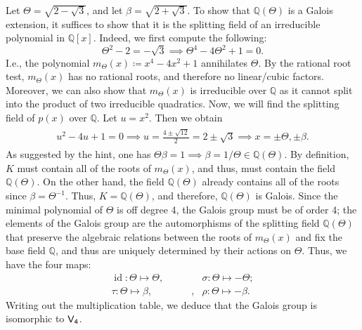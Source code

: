 \documentclass{article}
\begin{document}
	Let $\Theta = \sqrt{2 - \sqrt{3}}$, and let $\beta = \sqrt{2 + \sqrt{3}}$. To show that $\mathbb{Q}(\Theta)$ is a Galois extension, it suffices to show that it is the splitting field of an irreducible polynomial in $\mathbb{Q}[x]$. Indeed, we first compute the following: 
	\begin{equation*}
		\Theta^{2}- 2 = -\sqrt{3} \implies \Theta^{4} - 4\Theta^{2} + 1 = 0. 
	\end{equation*}
	I.e., the polynomial $m_{\Theta}(x) \coloneqq x^{4} - 4x^{2} + 1$ annihilates $\Theta$. By the rational root test, $m_{\Theta}(x)$ has no rational roots, and therefore no linear/cubic factors. Moreover, we can also show that $m_{\Theta}(x)$ is irreducible over $\mathbb{Q}$ as it cannot split into the product of two irreducible quadratics. Now, we will find the splitting field of $p(x)$ over $\mathbb{Q}$. Let $u = x^{2}$. Then we obtain 
	\begin{align*}
		\begin{split}
			u^{2} - 4u + 1 = 0 \implies u = \frac{4 \pm \sqrt{12}}{2} = 2 \pm \sqrt{3} \implies x = \pm \Theta, \pm \beta. 
		\end{split}
	\end{align*}
	As suggested by the hint, one has $\Theta \beta = 1 \implies \beta = 1/\Theta \in \mathbb{Q}(\Theta)$. By definition, $K$ must contain all of the roots of $m_{\Theta}(x)$, and thus, must contain the field $\mathbb{Q}(\Theta)$. On the other hand, the field $\mathbb{Q}(\Theta)$ already contains all of the roots since $\beta = \Theta^{-1}$. Thus, $K = \mathbb{Q}(\Theta)$, and therefore, $\mathbb{Q}(\Theta)$ is Galois. Since the minimal polynomial of $\Theta$ is off degree 4, the Galois group must be of order 4; the elements of the Galois group are the automorphisms of the splitting field $\mathbb{Q}(\Theta)$ that preserve the algebraic relations between the roots of $m_{\Theta}(x)$ and fix the base field $\mathbb{Q}$, and thus are uniquely determined by their actions on $\Theta$. Thus, we have the four maps: 
	\begin{equation*}
		\begin{matrix}
			\operatorname{id}: \Theta \mapsto \Theta, & \qquad & \sigma: \Theta \mapsto -\Theta; \\
			\tau: \Theta \mapsto \beta, & \qquad, & \rho: \Theta \mapsto -\beta. 
		\end{matrix}
	\end{equation*}
	Writing out the multiplication table, we deduce that the Galois group is isomorphic to $\sf{V}_{4}$. 
	
\end{document}
